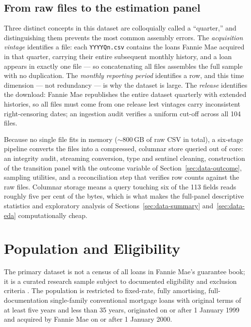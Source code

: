 \subsection{From raw files to the estimation panel}
\label{subsec:data-pipeline}

Three distinct concepts in this dataset are colloquially called a
``quarter,'' and distinguishing them prevents the most common
assembly errors.  The \emph{acquisition vintage} identifies a file:
each \texttt{YYYYQn.csv} contains the loans Fannie Mae acquired in
that quarter, carrying their entire subsequent monthly history, and a
loan appears in exactly one file --- so concatenating all files
assembles the full sample with no duplication.  The \emph{monthly
reporting period} identifies a row, and this time dimension --- not
redundancy --- is why the dataset is large.  The \emph{release}
identifies the download: Fannie Mae republishes the entire dataset
quarterly with extended histories, so all files must come from one
release lest vintages carry inconsistent right-censoring dates; an
ingestion audit verifies a uniform cut-off across all 104 files.

Because no single file fits in memory ($\sim$800\,GB of raw CSV in
total), a six-stage pipeline converts the files into a compressed,
columnar store queried out of core: an integrity audit, streaming
conversion, type and sentinel cleaning, construction of the
transition panel with the outcome variable of
Section~\ref{sec:data-outcome}, sampling utilities, and a
reconciliation step that verifies row counts against the raw files.
Columnar storage means a query touching six of the 113 fields reads
roughly five per cent of the bytes, which is what makes the
full-panel descriptive statistics and exploratory analysis of
Sections~\ref{sec:data-summary} and~\ref{sec:data-eda}
computationally cheap.

\section{Population and Eligibility}
\label{sec:data-population}

The primary dataset is not a census of all loans in Fannie Mae's
guarantee book; it is a curated research sample subject to documented
eligibility and exclusion criteria \citep{fanniemae2024}.  The
population is restricted to fixed-rate, fully amortising,
full-documentation single-family conventional mortgage loans with
original terms of at least five years and less than 35 years,
originated on or after 1 January 1999 and acquired by Fannie Mae on
or after 1 January 2000.

